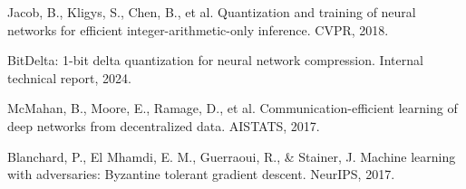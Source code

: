 \documentclass[11pt,letterpaper]{article}
\begin{document}
\begin{thebibliography}{99}
Jacob, B., Kligys, S., Chen, B., et al. Quantization and training of neural networks for efficient integer-arithmetic-only inference. CVPR, 2018.

BitDelta: 1-bit delta quantization for neural network compression. Internal technical report, 2024.

McMahan, B., Moore, E., Ramage, D., et al. Communication-efficient learning of deep networks from decentralized data. AISTATS, 2017.

Blanchard, P., El Mhamdi, E. M., Guerraoui, R., \& Stainer, J. Machine learning with adversaries: Byzantine tolerant gradient descent. NeurIPS, 2017.

\end{thebibliography}
\end{document}
